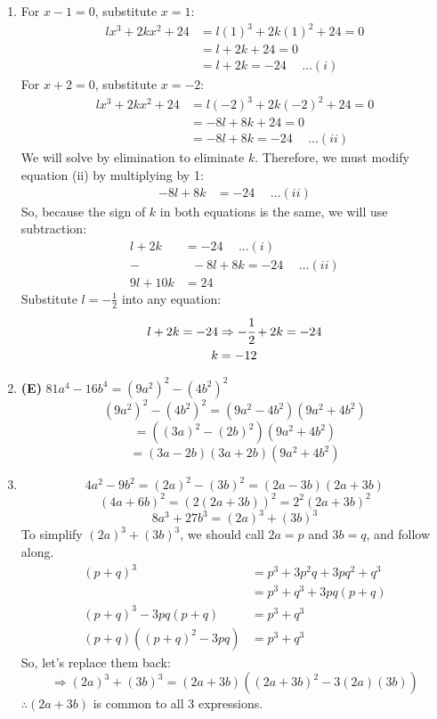 \begin{multicols}{2}
\begin{enumerate}[label={\textbf{\arabic*.}}]
   \item For \( x - 1 = 0 \), substitute \( x = 1 \):
   \begin{align*}
      lx^3 + 2kx^2 + 24 &= l(1)^3 + 2k(1)^2 + 24 = 0 \\
      &= l + 2k + 24 = 0 \\ 
      &= l + 2k = -24 \hspace{15pt}...(i)
   \end{align*}
   For \( x + 2 = 0 \), substitute \( x = -2 \):
   \begin{align*}
      lx^3 + 2kx^2 + 24 &= l(-2)^3 + 2k(-2)^2 + 24 = 0 \\
      &= -8l + 8k + 24 = 0 \\ 
      &= -8l + 8k = -24 \hspace{15pt}...(ii)
   \end{align*}
   We will solve by elimination to eliminate \( k \). Therefore, we must modify equation (ii) by multiplying by 1:
   \begin{align*}
       -8l + 8k &= -24 \hspace{15pt}...(ii)
   \end{align*}
   So, because the sign of \( k \) in both equations is the same, we will use subtraction:
   \begin{align*} 
        l + 2k &= -24 \hspace{15pt}...(i) \\
       - &\hspace{7pt} -8l + 8k = -24 \hspace{15pt}...(ii) \\
       9l + 10k &= 24
   \end{align*}
   Substitute \( l = -\frac{1}{2} \) into any equation:
   \begin{align*}
     l + 2k = -24 &\Rightarrow -\cfrac{1}{2} + 2k = -24 \\
     k &= -12
   \end{align*}

    \item \textbf{(E)} \( 81a^4 - 16b^4 = \left(9a^2\right)^2 - \left(4b^2\right)^2 \)
    \[\left(9a^2\right)^2 - \left(4b^2\right)^2 = (9a^2 - 4b^2)(9a^2 + 4b^2)\]
    \[ = \left((3a)^2 - (2b)^2\right)(9a^2 + 4b^2)\]
    \[= (3a - 2b)(3a + 2b)(9a^2 + 4b^2)\] 
\item 
    \[4a^2 - 9b^2 = (2a)^2 - (3b)^2 = (2a - 3b)(2a + 3b)\]
    \[(4a + 6b)^2 = \left(2(2a + 3b)\right)^2 = 2^2 (2a + 3b)^2\]
    \[ 8a^3 + 27b^3 = (2a)^3 + (3b)^3 \]
    To simplify \( (2a)^3 + (3b)^3 \), we should call \( 2a = p \) and \( 3b = q \), and follow along.
    \begin{align*}
        (p + q)^3 &= p^3 + 3p^2q + 3pq^2 + q^3 \\
        &= p^3 + q^3 + 3pq(p + q) \\
        (p + q)^3 - 3pq(p + q) &= p^3 + q^3 \\
        (p + q)((p + q)^2 - 3pq) &= p^3 + q^3
    \end{align*}
    So, let’s replace them back:
    \[\Rightarrow (2a)^3 + (3b)^3 = (2a + 3b)\left((2a + 3b)^2 - 3(2a)(3b)\right)\]
    \(\therefore (2a + 3b)\) is common to all 3 expressions.


\end{enumerate}
\end{multicols}
